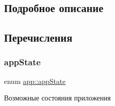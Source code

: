 \subsection{Подробное описание}


\subsection{Перечисления}
\mbox{\label{group___xD0_x9F_xD0_xB5_xD1_x80_xD0_xB5_xD1_x87_xD0_xB8_xD1_x81_xD0_xBB_xD0_xB5_xD0_xBD_xD0_xB8_xD1_x8F_ga290e8080c661e52c2f685fd4af148acf}} 
\subsubsection{\texorpdfstring{app\+State}{appState}}
{\footnotesize\ttfamily enum \hyperlink{group___xD0_x9F_xD0_xB5_xD1_x80_xD0_xB5_xD1_x87_xD0_xB8_xD1_x81_xD0_xBB_xD0_xB5_xD0_xBD_xD0_xB8_xD1_x8F_ga290e8080c661e52c2f685fd4af148acf}{app\+::app\+State}}



Возможные состояния приложения 

